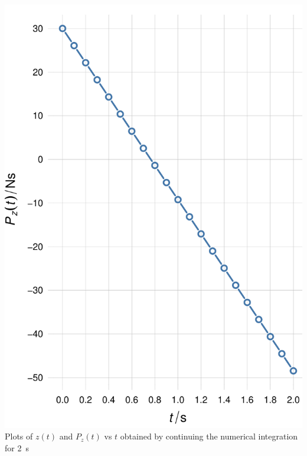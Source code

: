 \documentclass[a4paper,12pt,%
onecolumn,oneside,titlepage,%
british%
]{memoir}
\renewcommand*{\|}[1][]{\nonscript\:#1\vert\nonscript\:\mathopen{}}
\begin{document}
{\includegraphics[width=\linewidth]{images/plot_tennisball_P.pdf}%
\\[\jot]\footnotesize\flushleftright\color{mpcolor}%
Plots of $z(t)$ and $P_{z}(t)$ vs $t$ obtained by continuing the numerical integration for \qty{2}{s}%
}%
\end{document}

